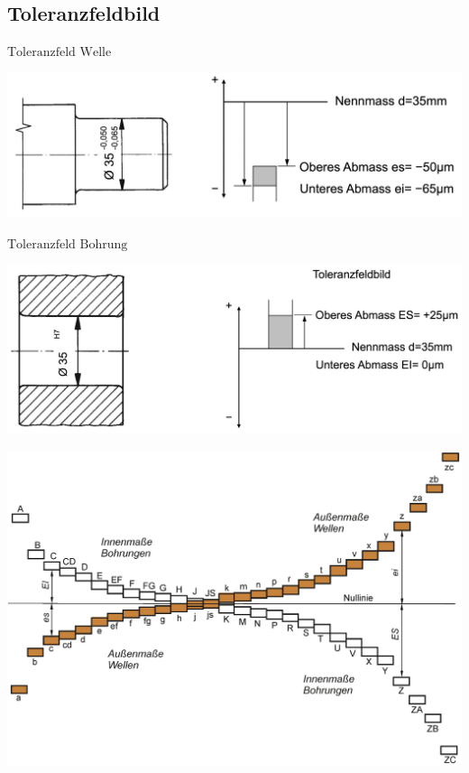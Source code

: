 \subsection{Toleranzfeldbild}
    \begin{minipage}{0.99\linewidth}
        \begin{minipage}{0.49\linewidth}
            $\text{Toleranzfeld Welle}$
    
            \begin{raggedright}
                \includegraphics[width = 0.9\linewidth]{src/images/MAEIP_Toleranzfeld_Welle.png}
            \end{raggedright}
        \end{minipage}
        \begin{minipage}{0.49\linewidth}
            $\text{Toleranzfeld Bohrung}$
    
            \begin{raggedleft}
                \includegraphics[width = 0.9\linewidth]{src/images/MAEIP_Toleranzfeld_Bohrung.png}
            \end{raggedleft}
        \end{minipage}
    \end{minipage}
    \includegraphics[width = 0.9\linewidth]{src/images/MAEIP_Toleranzfeld.png}